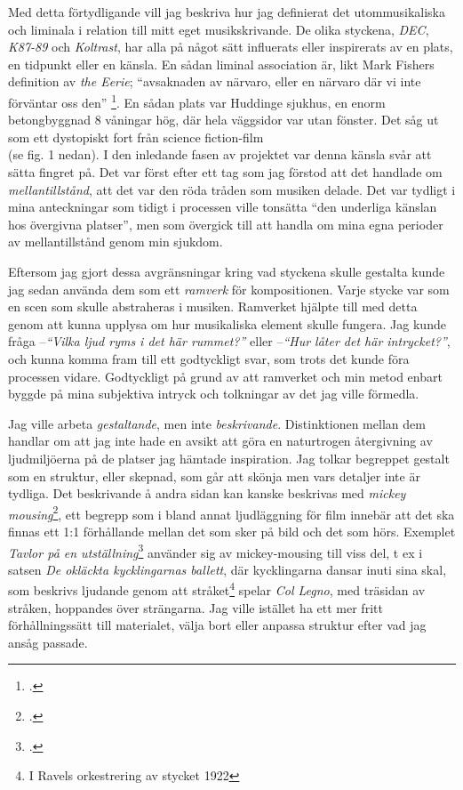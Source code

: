 \documentclass{article}
\begin{document}
Med detta förtydligande vill jag beskriva hur jag definierat det utommusikaliska och liminala i
relation till mitt eget musikskrivande. De olika styckena, \emph{DEC}, \emph{K87-89} och \emph{Koltrast}, har
alla på något sätt influerats eller inspirerats av en plats, en tidpunkt eller en känsla. 
En sådan liminal association är, likt Mark Fishers definition av \emph{the Eerie};
``avsaknaden av närvaro, eller en närvaro där vi inte förväntar oss den''
\footcite[Egen översättning, s. 12]{Fisher}.
En
sådan plats var Huddinge sjukhus, en enorm betongbyggnad 8 våningar hög, där hela väggsidor var utan fönster.
Det såg ut som ett dystopiskt fort från science fiction-film \\(se fig. 1 nedan). I den inledande fasen av
projektet var denna känsla svår att sätta fingret på. Det var först efter ett tag som jag förstod att det
handlade om \emph{mellantillstånd}, att det var den röda tråden som musiken delade. Det var tydligt i mina
anteckningar som tidigt i processen ville tonsätta ``den underliga känslan hos övergivna platser'', men som
övergick till att handla om mina egna perioder av mellantillstånd genom min sjukdom.

Eftersom jag gjort dessa avgränsningar kring vad styckena skulle gestalta kunde jag sedan använda dem som ett
\emph{ramverk} för kompositionen. Varje stycke var som en scen som skulle abstraheras i musiken. Ramverket
hjälpte till med detta genom att kunna upplysa om hur musikaliska element skulle fungera. Jag kunde fråga 
--\emph{``Vilka ljud ryms i det här rummet?''} eller --\emph{``Hur låter det här intrycket?''}, och kunna
komma fram till ett godtyckligt svar, som trots det kunde föra processen vidare. Godtyckligt på grund av att
ramverket och min metod enbart byggde på mina subjektiva intryck och tolkningar av det jag ville förmedla.


Jag ville arbeta \emph{gestaltande}, men inte \emph{beskrivande}. Distinktionen mellan dem handlar om att jag
inte hade en avsikt att göra en naturtrogen återgivning av ljudmiljöerna på de platser jag hämtade
inspiration. Jag tolkar begreppet gestalt som en struktur, eller skepnad, som går att skönja men vars detaljer
inte är tydliga. Det beskrivande å andra sidan kan kanske beskrivas med \emph{mickey
mousing}\footcite{mickeymouse}, ett begrepp som i bland annat ljudläggning för film innebär att det ska finnas
ett 1:1 förhållande mellan det som sker på bild och det som hörs. Exemplet \emph{Tavlor på en
utställning}\footcite{Tavlor} använder sig av mickey-mousing till viss del, t ex i satsen \emph{De okläckta
kycklingarnas ballett}, där kycklingarna dansar inuti sina skal, som beskrivs ljudande genom att
stråket\footnote{I Ravels orkestrering av stycket 1922} spelar \emph{Col Legno}, med träsidan av stråken,
hoppandes över strängarna. Jag ville istället ha ett mer fritt förhållningssätt till materialet, välja bort
eller anpassa struktur efter vad jag ansåg passade.
\end{document}
